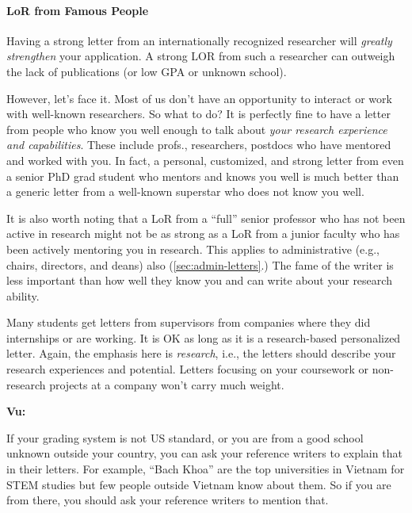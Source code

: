 \documentclass[oneside,11pt,dvipsnames]{book}
\newenvironment{commentbox}[1][]{
  \small
  \begin{mybox}
    {\small \textbf{#1}}
  }{
  \end{mybox}
}
\begin{document}
\paragraph{LoR from Famous People} Having a strong letter from an internationally recognized researcher will \emph{greatly strengthen} your application. A strong LOR from such a researcher can outweigh the lack of publications (or low GPA or unknown school).


However, let's face it.  Most of us don't have an opportunity to interact or work with well-known researchers.  
So what to do? It is perfectly fine to have a letter from people who know you well enough to talk about \emph{your research experience and capabilities}. These include profs., researchers, postdocs who have mentored and worked with you. In fact, a personal, customized, and strong letter from even a senior PhD grad student who mentors and knows you well is much better than a generic letter from a well-known superstar who does not know you well. 

It is also worth noting that a LoR from a ``full'' senior professor who has not been active in research might not be as strong as a LoR from a junior faculty who has been actively mentoring you in research.  This applies to administrative (e.g., chairs, directors, and deans) also (\autoref{sec:admin-letters}.) The fame of the writer is less important than how well they know you and can write about your research ability.

Many students get letters from supervisors from companies where they did internships or are working.  It is OK as long as it is a research-based personalized letter. Again, the emphasis here is \emph{research}, i.e., the letters should describe your research experiences and potential. Letters focusing on your coursework or non-research projects at a company won't carry much weight.

\begin{commentbox}[Vu:]
  If your grading system is not US standard, or you are from a good school unknown outside your country, you can ask your reference writers to explain that in their letters.  For example, ``Bach Khoa'' are the top universities in Vietnam for STEM studies but few people outside Vietnam know about them.  So if you are from there, you should ask your reference writers to mention that.
\end{commentbox}
\end{document}
